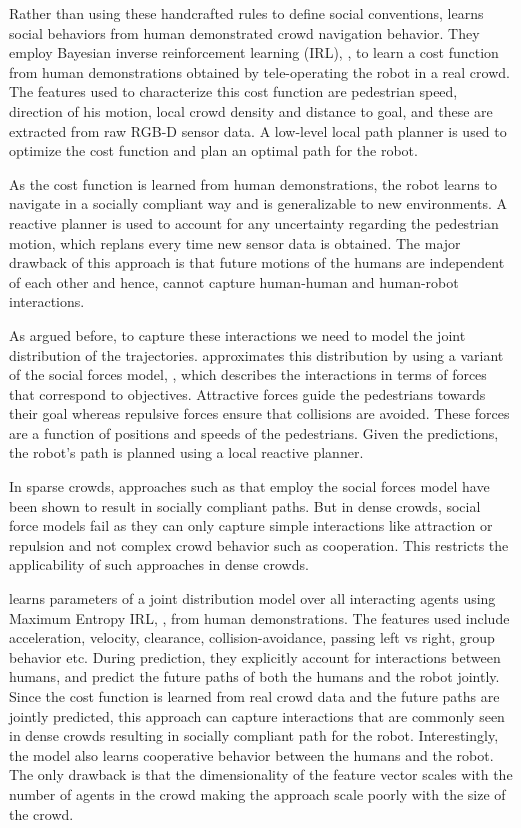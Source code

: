 Rather than using these handcrafted rules to define social conventions, \cite{kim2016socially} learns social behaviors from human demonstrated crowd navigation behavior. They employ Bayesian inverse reinforcement learning (IRL), \cite{Ramachandran2007BayesianIR}, to learn a cost function from human demonstrations obtained by tele-operating the robot in a real crowd. The features used to characterize this cost function are pedestrian speed, direction of his motion, local crowd density and distance to goal, and these are extracted from raw RGB-D sensor data. A low-level local path planner is used to optimize the cost function and plan an optimal path for the robot.

As the cost function is learned from human demonstrations, the robot learns to navigate in a socially compliant way and is generalizable to new environments. A reactive planner is used to account for any uncertainty regarding the pedestrian motion, which replans every time new sensor data is obtained. The major drawback of this approach is that future motions of the humans are independent of each other and hence, cannot capture human-human and human-robot interactions.

As argued before, to capture these interactions we need to model the joint distribution of the trajectories. \cite{shiomi2014towards} approximates this distribution by using a variant of the social forces model, \cite{helbing95}, which describes the interactions in terms of forces that correspond to objectives. Attractive forces guide the pedestrians towards their goal whereas repulsive forces ensure that collisions are avoided. These forces are a function of positions and speeds of the pedestrians. Given the predictions, the robot's path is planned using a local reactive planner.

In sparse crowds, approaches such as \cite{shiomi2014towards} that employ the social forces model have been shown to result in socially compliant paths. But in dense crowds, social force models fail as they can only capture simple interactions like attraction or repulsion and not complex crowd behavior such as cooperation. This restricts the applicability of such approaches in dense crowds.

\cite{kretzschmar2016socially} learns parameters of a joint distribution model over all interacting agents using Maximum Entropy IRL, \cite{Ziebart2008MaximumEI}, from human demonstrations. The features used include acceleration, velocity, clearance, collision-avoidance, passing left vs right, group behavior etc. During prediction, they explicitly account for interactions between humans, and predict the future paths of both the humans and the robot jointly. Since the cost function is learned from real crowd data and the future paths are jointly predicted, this approach can capture interactions that are commonly seen in dense crowds resulting in socially compliant path for the robot. Interestingly, the model also learns cooperative behavior between the humans and the robot. The only drawback is that the dimensionality of the feature vector scales with the number of agents in the crowd making the approach scale poorly with the size of the crowd.

